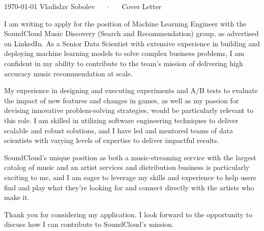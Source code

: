 \documentclass[11pt, a4paper]{awesome-cv}
\begin{document}
\makecvheader[R]

\makecvfooter
  {\today}
  {Vladislav Sobolev~~~·~~~Cover Letter}
  {}

\makelettertitle

\begin{cvletter}


I am writing to apply for the position of Machine Learning Engineer with the SoundCloud Music Discovery (Search and Recommendation) group, as advertised on LinkedIn. As a Senior Data Scientist with extensive experience in building and deploying machine learning models to solve complex business problems, I am confident in my ability to contribute to the team's mission of delivering high accuracy music recommendation at scale.

My experience in designing and executing experiments and A/B tests to evaluate the impact of new features and changes in games, as well as my passion for devising innovative problem-solving strategies, would be particularly relevant to this role. I am skilled in utilizing software engineering techniques to deliver scalable and robust solutions, and I have led and mentored teams of data scientists with varying levels of expertise to deliver impactful results.

SoundCloud's unique position as both a music-streaming service with the largest catalog of music and an artist services and distribution business is particularly exciting to me, and I am eager to leverage my skills and experience to help users find and play what they're looking for and connect directly with the artists who make it.

Thank you for considering my application. I look forward to the opportunity to discuss how I can contribute to SoundCloud's mission.



\end{cvletter}
\end{document}
